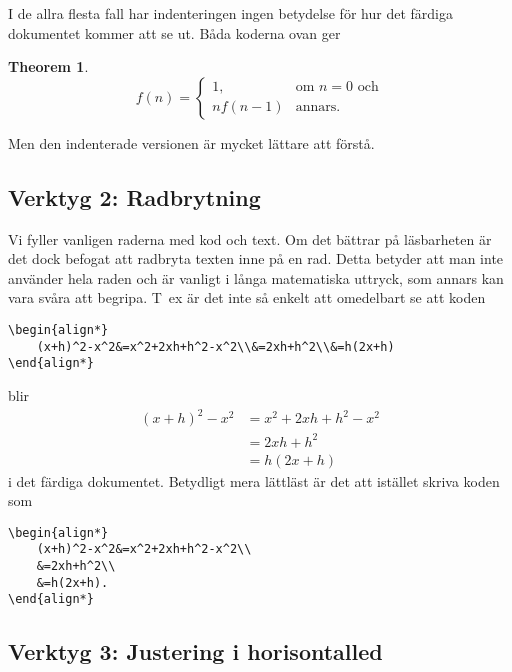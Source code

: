 \documentclass[a4paper,12pt]{article}
\newtheorem{theorem}{Theorem}
\begin{document}
I de allra flesta fall har indenteringen ingen betydelse för hur det
färdiga dokumentet kommer att se ut. Båda koderna ovan ger
%    
\begin{theorem}
    \begin{displaymath}
        f(n) = 
        \begin{cases}
            1, & \text{om $n=0$ och} \\
            nf(n-1) & \text{annars.}
        \end{cases}
    \end{displaymath}
\end{theorem}
%   
\noindent Men den indenterade versionen är mycket lättare att förstå.

\subsection*{Verktyg 2: Radbrytning}

Vi fyller vanligen raderna med kod och text. Om det bättrar på läsbarheten
är det dock befogat att radbryta texten inne på en rad. Detta betyder
att man inte använder hela raden och är vanligt i långa matematiska
uttryck, som annars kan vara svåra att begripa. T~ex är det inte så
enkelt att omedelbart se att koden
%    
\begin{verbatim}
\begin{align*}
    (x+h)^2-x^2&=x^2+2xh+h^2-x^2\\&=2xh+h^2\\&=h(2x+h)
\end{align*}
\end{verbatim}
%
blir
%    
\begin{align*}
    (x+h)^2-x^2&=x^2+2xh+h^2-x^2\\&=2xh+h^2\\&=h(2x+h)
\end{align*}
%
i det färdiga dokumentet. Betydligt mera lättläst är det att
istället skriva koden som
%
\begin{verbatim}
\begin{align*}
    (x+h)^2-x^2&=x^2+2xh+h^2-x^2\\
    &=2xh+h^2\\
    &=h(2x+h).
\end{align*}
\end{verbatim}

\subsection*{Verktyg 3: Justering i horisontalled}
\end{document}
